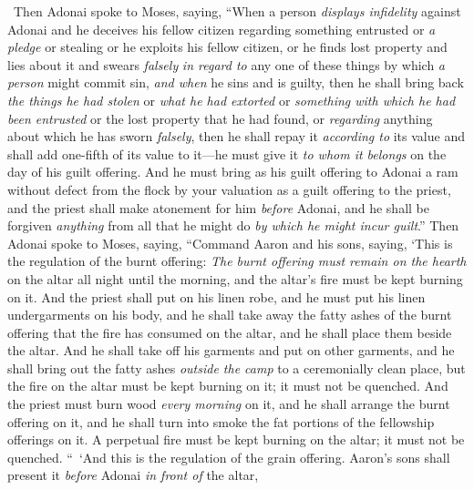 \begin{biblechapter} %
  Then Adonai spoke to Moses, saying,
\verse “When a person \textit{displays infidelity} against Adonai and he deceives his fellow citizen regarding something entrusted or \textit{a pledge} or stealing or he exploits his fellow citizen,
\verse or he finds lost property and lies about it and swears \textit{falsely} \textit{in regard to} any one of these things by which \textit{a person} might commit sin,
\verse \textit{and when} he sins and is guilty, then he shall bring back \textit{the things he had stolen} or \textit{what he had extorted} or \textit{something with which he had been entrusted} or the lost property that he had found,
\verse or \textit{regarding} anything about which he has sworn \textit{falsely}, then he shall repay it \textit{according to} its value and shall add one-fifth of its value to it—he must give it \textit{to whom it belongs} on the day of his guilt offering.
\verse And he must bring as his guilt offering to Adonai a ram without defect from the flock by your valuation as a guilt offering to the priest,
\verse and the priest shall make atonement for him \textit{before} Adonai, and he shall be forgiven \textit{anything} from all that he might do \textit{by which he might incur guilt}.”
\verse Then Adonai spoke to Moses, saying,
\verse “Command Aaron and his sons, saying, ‘This is the regulation of the burnt offering: \textit{The burnt offering must remain on the hearth} on the altar all night until the morning, and the altar’s fire must be kept burning on it.
\verse And the priest shall put on his linen robe, and he must put his linen undergarments on his body, and he shall take away the fatty ashes of the burnt offering that the fire has consumed on the altar, and he shall place them beside the altar.
\verse And he shall take off his garments and put on other garments, and he shall bring out the fatty ashes \textit{outside the camp} to a ceremonially clean place,
\verse but the fire on the altar must be kept burning on it; it must not be quenched. And the priest must burn wood \textit{every morning} on it, and he shall arrange the burnt offering on it, and he shall turn into smoke the fat portions of the fellowship offerings on it.
\verse A perpetual fire must be kept burning on the altar; it must not be quenched.
 “ ‘And this is the regulation of the grain offering. Aaron’s sons shall present it \textit{before} Adonai \textit{in front of} the altar,

\end{biblechapter}

